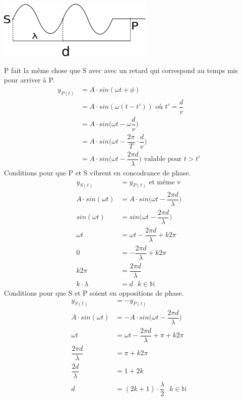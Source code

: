 \documentclass[11pt]{article}
\begin{document}
\begin{center}
    \includegraphics{EtudeMathOndeSinusProg.png}
\end{center}
P fait la même chose que S avec avec un retard qui correspond au temps mis pour arriver à P.
\begin{equation}
    \begin{split}
        y_{P(t)} & = A \cdot sin(\omega t + \phi) \\
        &= A \cdot sin(\omega (t-t')) \text{ où } t' = \dfrac{d}{v}\\
        &= A\cdot sin\Big(\omega t - \omega \dfrac{d}{v}\Big)\\
        &= A \cdot sin\Big(\omega t - \dfrac{2\pi}{T}\cdot \dfrac{d}{v}\Big) \\
        &= A \cdot sin\Big(\omega t - \dfrac{2\pi d}{\lambda}\Big) \text{ valable pour } t > t'
    \end{split}
\end{equation}
Conditions pour que P et S vibrent en concodrance de phase.
\begin{equation}
    \begin{split}
        y_{S(t)} &= y_{P(t)}  \text{ et même v}\\
        A\cdot sin(\omega t) &= A\cdot sin\Big(\omega t - \dfrac{2\pi d}{\lambda}\Big)\\
         sin(\omega t) &= sin\Big(\omega t - \dfrac{2\pi d}{\lambda}\Big)\\
         \omega t &= \omega t - \dfrac{2\pi d}{\lambda} + k2\pi \\
         0 &=  - \dfrac{2\pi d}{\lambda} + k2\pi \\
         k2\pi &= \dfrac{2\pi d}{\lambda} \\
         k\cdot \lambda& = d \text{  } k \in \mathbb{N}
    \end{split}
\end{equation}
Conditions pour que S et P soient en oppositions de phase.
\begin{equation}
    \begin{split}
        y_{S(t)} &= -y_{P(t)}\\
        A\cdot sin(\omega t) &= -A \cdot sin\Big(\omega t - \dfrac{2\pi d}{\lambda}\Big)\\
        \omega t &= \omega t - \dfrac{2\pi d}{\lambda} + \pi + k2\pi\\
        \dfrac{2\pi d}{\lambda}& = \pi + k2\pi\\
        \dfrac{2 d}{\lambda}& = 1+2k\\
        d&= (2k+1)\cdot \dfrac{\lambda}{2} \text{ } k \in \mathbb{N}\\
    \end{split}
\end{equation}
\end{document}
